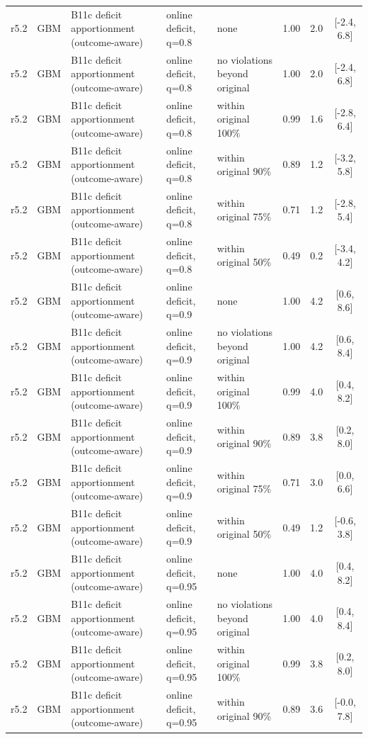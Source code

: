\begin{longtable}{lllp{4.2cm}p{3.4cm}ccc}
r5.2 & GBM & B11c deficit apportionment (outcome-aware) & online deficit, q=0.8 & none & 1.00 & 2.0 & [-2.4, 6.8] \\
r5.2 & GBM & B11c deficit apportionment (outcome-aware) & online deficit, q=0.8 & no violations beyond original & 1.00 & 2.0 & [-2.4, 6.8] \\
r5.2 & GBM & B11c deficit apportionment (outcome-aware) & online deficit, q=0.8 & within original 100\% & 0.99 & 1.6 & [-2.8, 6.4] \\
r5.2 & GBM & B11c deficit apportionment (outcome-aware) & online deficit, q=0.8 & within original 90\% & 0.89 & 1.2 & [-3.2, 5.8] \\
r5.2 & GBM & B11c deficit apportionment (outcome-aware) & online deficit, q=0.8 & within original 75\% & 0.71 & 1.2 & [-2.8, 5.4] \\
r5.2 & GBM & B11c deficit apportionment (outcome-aware) & online deficit, q=0.8 & within original 50\% & 0.49 & 0.2 & [-3.4, 4.2] \\
r5.2 & GBM & B11c deficit apportionment (outcome-aware) & online deficit, q=0.9 & none & 1.00 & 4.2 & [0.6, 8.6] \\
r5.2 & GBM & B11c deficit apportionment (outcome-aware) & online deficit, q=0.9 & no violations beyond original & 1.00 & 4.2 & [0.6, 8.4] \\
r5.2 & GBM & B11c deficit apportionment (outcome-aware) & online deficit, q=0.9 & within original 100\% & 0.99 & 4.0 & [0.4, 8.2] \\
r5.2 & GBM & B11c deficit apportionment (outcome-aware) & online deficit, q=0.9 & within original 90\% & 0.89 & 3.8 & [0.2, 8.0] \\
r5.2 & GBM & B11c deficit apportionment (outcome-aware) & online deficit, q=0.9 & within original 75\% & 0.71 & 3.0 & [0.0, 6.6] \\
r5.2 & GBM & B11c deficit apportionment (outcome-aware) & online deficit, q=0.9 & within original 50\% & 0.49 & 1.2 & [-0.6, 3.8] \\
r5.2 & GBM & B11c deficit apportionment (outcome-aware) & online deficit, q=0.95 & none & 1.00 & 4.0 & [0.4, 8.2] \\
r5.2 & GBM & B11c deficit apportionment (outcome-aware) & online deficit, q=0.95 & no violations beyond original & 1.00 & 4.0 & [0.4, 8.4] \\
r5.2 & GBM & B11c deficit apportionment (outcome-aware) & online deficit, q=0.95 & within original 100\% & 0.99 & 3.8 & [0.2, 8.0] \\
r5.2 & GBM & B11c deficit apportionment (outcome-aware) & online deficit, q=0.95 & within original 90\% & 0.89 & 3.6 & [-0.0, 7.8] \\

\end{longtable}
